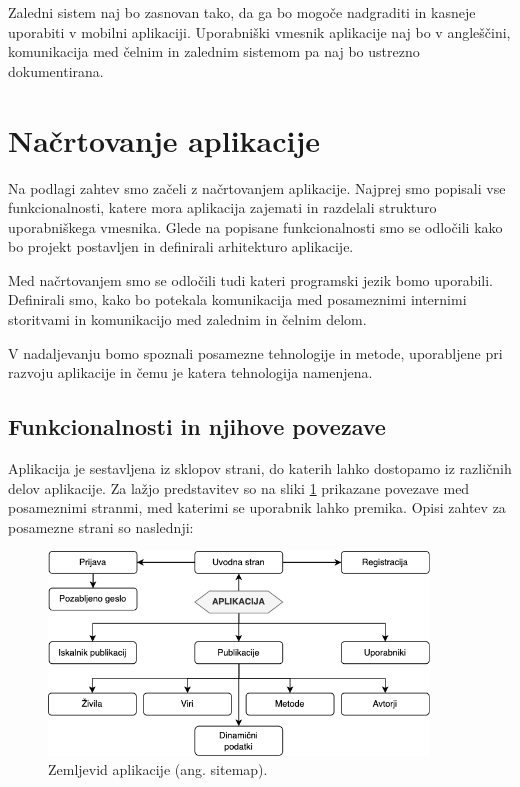Zaledni sistem naj bo zasnovan tako, da ga bo mogoče nadgraditi in kasneje uporabiti v mobilni aplikaciji. Uporabniški vmesnik aplikacije naj bo v angleščini, komunikacija med čelnim in zalednim sistemom pa naj bo ustrezno dokumentirana.

\clearpage


\section{Načrtovanje aplikacije}
\label{nacrtovanje}

Na podlagi zahtev smo začeli z načrtovanjem aplikacije. Najprej smo popisali vse funkcionalnosti, katere mora aplikacija zajemati in razdelali strukturo uporabniškega vmesnika. Glede na popisane funkcionalnosti smo se odločili kako bo projekt postavljen in definirali arhitekturo aplikacije.

Med načrtovanjem smo se odločili tudi kateri programski jezik bomo uporabili. Definirali smo, kako bo potekala komunikacija med posameznimi internimi storitvami in komunikacijo med zalednim in čelnim delom.

V nadaljevanju bomo spoznali posamezne tehnologije in metode, uporabljene pri razvoju aplikacije in čemu je katera tehnologija namenjena.

\subsection{Funkcionalnosti in njihove povezave}
Aplikacija je sestavljena iz sklopov strani, do katerih lahko dostopamo iz različnih delov aplikacije. Za lažjo predstavitev so na sliki \ref{sitemap} prikazane povezave med posameznimi stranmi, med katerimi se uporabnik lahko premika. Opisi zahtev za posamezne strani so naslednji:


\begin{figure}[h]
\begin{center}
\includegraphics[width=0.9\textwidth]{slike/page-map.png}
\end{center}
\caption{ Zemljevid aplikacije (ang. sitemap). }
\label{sitemap}
\end{figure}


